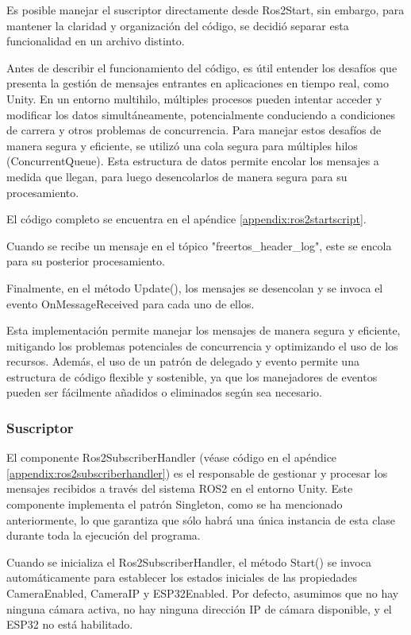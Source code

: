 Es posible manejar el suscriptor directamente desde Ros2Start, sin embargo, para mantener la claridad y organización del código, se decidió separar esta funcionalidad en un archivo distinto.



Antes de describir el funcionamiento del código, es útil entender los desafíos que presenta la gestión de mensajes entrantes en aplicaciones en tiempo real, como Unity. En un entorno multihilo, múltiples procesos pueden intentar acceder y modificar los datos simultáneamente, potencialmente conduciendo a condiciones de carrera y otros problemas de concurrencia. Para manejar estos desafíos de manera segura y eficiente, se utilizó una cola segura para múltiples hilos (ConcurrentQueue). Esta estructura de datos permite encolar los mensajes a medida que llegan, para luego desencolarlos de manera segura para su procesamiento.

El código completo se encuentra en el apéndice \ref{appendix:ros2startscript}.

Cuando se recibe un mensaje en el tópico "freertos\_header\_log", este se encola para su posterior procesamiento.


Finalmente, en el método Update(), los mensajes se desencolan y se invoca el evento OnMessageReceived para cada uno de ellos.


Esta implementación permite manejar los mensajes de manera segura y eficiente, mitigando los problemas potenciales de concurrencia y optimizando el uso de los recursos. Además, el uso de un patrón de delegado y evento permite una estructura de código flexible y sostenible, ya que los manejadores de eventos pueden ser fácilmente añadidos o eliminados según sea necesario.

\subsubsection{Suscriptor}
\label{subsection:subscriptor}
El componente Ros2SubscriberHandler (véase código en el apéndice \ref{appendix:ros2subscriberhandler}) es el responsable de gestionar y procesar los mensajes recibidos a través del sistema ROS2 en el entorno Unity. Este componente implementa el patrón Singleton, como se ha mencionado anteriormente, lo que garantiza que sólo habrá una única instancia de esta clase durante toda la ejecución del programa.

Cuando se inicializa el Ros2SubscriberHandler, el método Start() se invoca automáticamente para establecer los estados iniciales de las propiedades CameraEnabled, CameraIP y ESP32Enabled. Por defecto, asumimos que no hay ninguna cámara activa, no hay ninguna dirección IP de cámara disponible, y el ESP32 no está habilitado.

